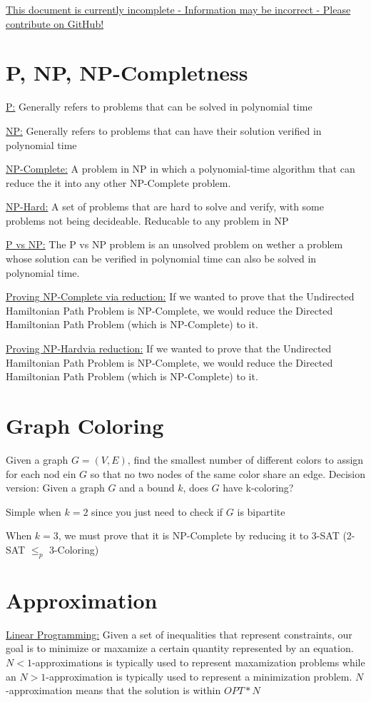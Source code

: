\documentclass{article}
\begin{document}
\underline{This document is currently incomplete - Information may be incorrect - Please contribute on GitHub!}

\section{P, NP, NP-Completness}

\underline{P:} Generally refers to problems that can be solved in polynomial time

\underline{NP:} Generally refers to problems that can have their solution verified in polynomial time

\underline{NP-Complete:} A problem in NP in which a polynomial-time algorithm that can reduce
the it into any other NP-Complete problem. 

\underline{NP-Hard:} A set of problems that are hard to solve and verify, with some problems not being decideable. Reducable to any problem in NP

\underline{P vs NP:} The P vs NP problem is an unsolved problem on wether a problem whose solution can be
verified in polynomial time can also be solved in polynomial time. 

\underline{Proving NP-Complete via reduction:} If we wanted to prove that the Undirected Hamiltonian Path Problem 
is NP-Complete, we would reduce the Directed Hamiltonian Path Problem (which is NP-Complete) to it.

\underline{Proving NP-Hardvia reduction:} If we wanted to prove that the Undirected Hamiltonian Path Problem 
is NP-Complete, we would reduce the Directed Hamiltonian Path Problem (which is NP-Complete) to it.

\section{Graph Coloring}
Given a graph $G = (V, E)$, find the smallest number of different colors to assign for 
each nod ein $G$ so that no two nodes of the same color share an edge. Decision version: 
Given a graph $G$ and a bound $k$, does $G$ have k-coloring?

Simple when $k=2$ since you just need to check if $G$ is bipartite

When $k=3$, we must prove that it is NP-Complete by reducing it to 3-SAT (2-SAT $\leq_p$ 3-Coloring)

\section{Approximation}
\underline{Linear Programming:} Given a set of inequalities that represent constraints, our
goal is to minimize or maxamize a certain quantity represented 
by an equation.
$N<1$-approximations is typically used to represent maxamization problems while
an $N>1$-approximation is typically used to represent a minimization problem. 
$N$-approximation means that the solution is within $OPT*N$
\end{document}
